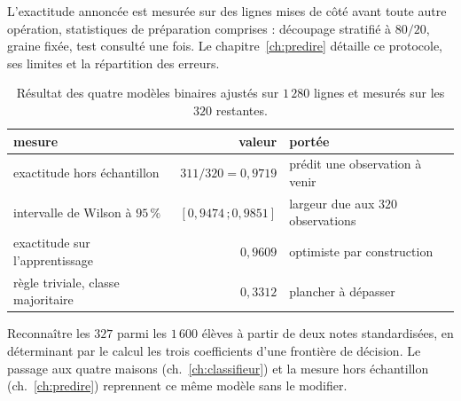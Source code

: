L'exactitude annoncée est mesurée sur des lignes mises de côté avant toute autre
opération, statistiques de préparation comprises : découpage stratifié à
$80/20$, graine fixée, test consulté une fois. Le chapitre~\ref{ch:predire}
détaille ce protocole, ses limites et la répartition des erreurs.

\begin{table}[htbp]
\centering
\begin{tabular}{lrl}
\toprule
mesure & valeur & portée \\
\midrule
exactitude hors échantillon & $311/320=0{,}9719$ & prédit une observation à venir \\
intervalle de Wilson à $95\,\%$ & $[0{,}9474\,;0{,}9851]$ & largeur due aux $320$ observations \\
exactitude sur l'apprentissage & $0{,}9609$ & optimiste par construction \\
règle triviale, classe majoritaire & $0{,}3312$ & plancher à dépasser \\
\bottomrule
\end{tabular}
\caption{Résultat des quatre modèles binaires ajustés sur $1\,280$ lignes et
mesurés sur les $320$ restantes.}
\label{tab:resultat-honnete}
\end{table}

\begin{resultat}
Reconnaître les $327$ \Gryf parmi les $1\,600$ élèves à partir de deux notes
standardisées, en déterminant par le calcul les trois coefficients d'une
frontière de décision. Le passage aux quatre maisons
(ch.~\ref{ch:classifieur}) et la mesure hors échantillon
(ch.~\ref{ch:predire}) reprennent ce même modèle sans le modifier.
\end{resultat}
